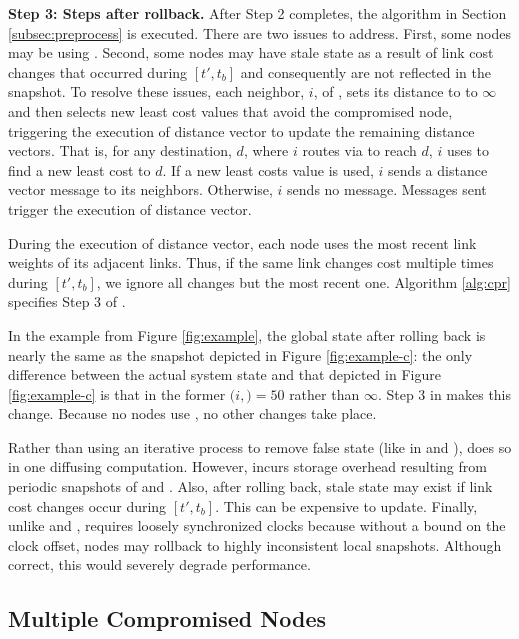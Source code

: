 {\bf Step 3: Steps after rollback.} After Step 2 completes, the algorithm in Section \ref{subsec:preprocess} is executed.
There are two issues to address.
First, some nodes may be using \oldvectors.  Second, some nodes may have stale state as a result of link cost changes that occurred during $[t',t_b]$ and 
consequently are not reflected in the snapshot. 
To resolve these issues, each neighbor, $i$, of \bads, sets its distance to \bad to $\infty$ and then selects new least cost values that avoid the compromised node, triggering
the execution of distance vector to update the remaining distance vectors.  That is, for any destination, $d$, where $i$ routes via \bad to reach $d$,
$i$ uses \dmatrixi to find a new least cost to $d$. If a new least costs value is used, $i$ sends a distance vector message to its neighbors. Otherwise, $i$ sends no message.
Messages sent trigger the execution of distance vector.

During the execution of distance vector, each node uses the most recent link weights of its adjacent links. Thus, 
if the same link changes cost multiple times during  $[t',t_b]$, we ignore all changes but the most recent one. Algorithm \ref{alg:cpr} specifies Step 3 of \cprs.

In the example from Figure \ref{fig:example}, the global state after rolling back is nearly the same as the snapshot depicted in Figure \ref{fig:example-c}:
the only difference between the actual system state and that depicted in Figure \ref{fig:example-c} is that in the former 
$(i,$\bads$)=50$ rather than $\infty$. Step 3 in \cpr makes this change.  Because no nodes use \oldvectors, no other changes take place.

Rather than using an iterative process to remove false state (like in \second and \purges), \cpr does so in one diffusing computation.
However, \cpr incurs storage overhead resulting from periodic snapshots of \minv and \dmatrixs.  Also, after rolling back, stale state may exist if link cost changes occur during $[t',t_b]$.
This can be expensive to update.
Finally, unlike \purge and \seconds, \cpr requires loosely synchronized clocks because without a bound on the clock offset, nodes may rollback to highly inconsistent local snapshots.
Although correct, this would severely degrade \cpr performance.

\subsection{Multiple Compromised Nodes}
\label{subsec:mult}

